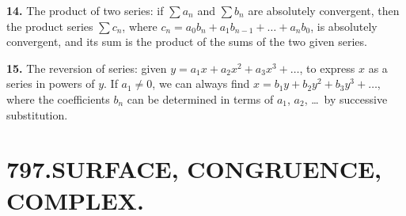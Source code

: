 \documentclass[11pt,a4paper]{article}
\begin{document}
\textbf{14.}\quad
The product of two series: if $\sum a_{n}$ and $\sum b_{n}$ are absolutely convergent, then the product series $\sum c_{n}$, where $c_{n} = a_{0}b_{n} + a_{1}b_{n-1} + \ldots + a_{n}b_{0}$, is absolutely convergent, and its sum is the product of the sums of the two given series.

\textbf{15.}\quad
The reversion of series: given $y = a_{1}x + a_{2}x^{2} + a_{3}x^{3} + \ldots$, to express $x$ as a series in powers of $y$. If $a_{1} \neq 0$, we can always find $x = b_{1}y + b_{2}y^{2} + b_{3}y^{3} + \ldots$, where the coefficients $b_{n}$ can be determined in terms of $a_{1}$, $a_{2}$, \ldots\ by successive substitution.





\section*{797.\quad SURFACE, CONGRUENCE, COMPLEX.}


\smallskip
\end{document}
